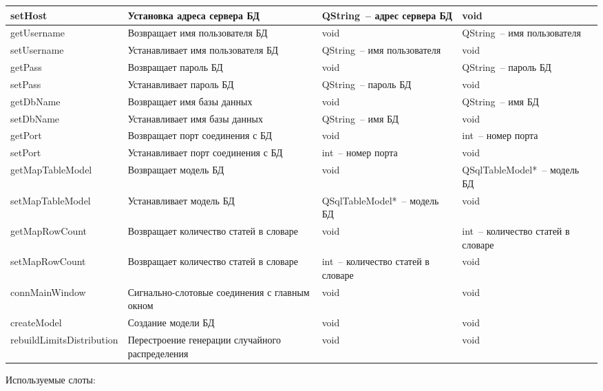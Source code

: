\documentclass[a4paper,14pt,russian]{extreport}
\begin{document}
\begin{longtable}{|m{3 cm}|m{3 cm}|m{4 cm}|m{4 cm}|}
\hline
setHost & Установка адреса сервера БД & QString~-- адрес сервера БД & void \\
\hline
{get\-Username} & Возвращает имя пользователя БД & void & QString~-- имя пользователя \\
\hline
{set\-Username} & Устанавливает имя пользователя БД & QString~-- имя пользователя & void \\
\hline
getPass & Возвращает пароль БД & void & QString~-- пароль БД \\
\hline
setPass & Устанавливает пароль БД & QString~-- пароль БД & void \\
\hline
{getDb\-Name} & Возвращает имя базы данных & void & QString~-- имя БД \\
\hline
{setDb\-Name} & Устанавливает имя базы данных & QString~-- имя БД & void \\
\hline
getPort & Возвращает порт соединения с БД & void & int~-- номер порта \\
\hline
setPort & Устанавливает порт соединения с БД & int~-- номер порта & void \\
\hline
{get\-Map\-Table\-Model} & Возвращает модель БД & void & {QSql\-Table\-Model*}~-- модель БД \\
\hline
{set\-Map\-Table\-Model} & Устанавливает модель БД & {QSql\-Table\-Model*}~-- модель БД & void \\
\hline
{get\-Map\-Row\-Count} & Возвращает количество статей в словаре & void & int~-- количество статей в словаре \\
\hline
{set\-Map\-Row\-Count} & Возвращает количество статей в словаре & int~-- количество статей в словаре & void \\
\hline
{conn\-Main\-Window} & Сигнально-слотовые соединения с главным окном & void & void \\
\hline
{create\-Model} & Создание модели БД & void & void \\
\hline
{rebuild\-Limits\-Distribution} & Перестроение генерации случайного распределения & void & void \\
\hline
\end{longtable}

Используемые слоты:
\end{document}
